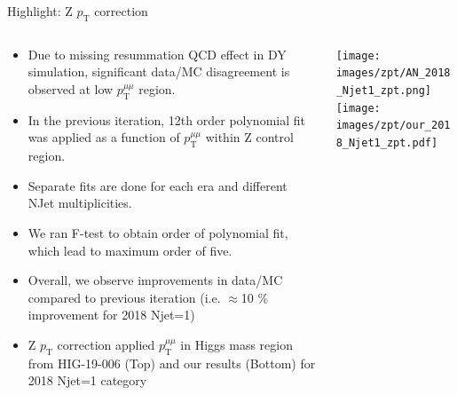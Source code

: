 \documentclass[dvipsnames,aspectratio=169]{beamer}
\begin{document}
\begin{frame}{Highlight: Z $p_\mathrm{T}$ correction}
    \begin{columns}
        \begin{column}{0.75\textwidth}
            {\fontsize{10pt}{12pt}\selectfont 
            \begin{itemize}
            \item Due to missing resummation QCD effect in DY simulation, significant data/MC disagreement is observed at low $p_\mathrm{T}^{\mu\mu}$ region.
            \item In the previous iteration, 12th order polynomial fit was applied as a function of $p_\mathrm{T}^{\mu\mu}$ within Z control region.
            \item Separate fits are done for each era and different NJet multiplicities.
            \item We ran F-test to obtain order of polynomial fit, which lead to maximum order of five.
            \item Overall, we observe improvements in data/MC compared to previous iteration (i.e. $\approx$10 \% improvement for 2018 Njet=1)
            \item Z $p_\mathrm{T}$ correction applied $p_\mathrm{T}^{\mu\mu}$ in Higgs mass region from HIG-19-006 (Top) and our results (Bottom) for 2018 Njet=1 category
            \end{itemize}
            }
        \end{column}
        
        \begin{column}{0.25\textwidth}
            \centering
            {\texttt{[image: images/zpt/AN\_2018\_Njet1\_zpt.png]}}\\
            {\texttt{[image: images/zpt/our\_2018\_Njet1\_zpt.pdf]}}
        \end{column}
    \end{columns}
\end{frame}
\end{document}
